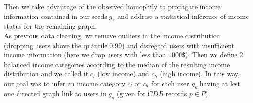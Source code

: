 
Then we take advantage of the observed homophily to propagate income information contained in our seeds $g_s$ and address a statistical inference of income status for the remaining graph. \\

As previous data cleaning, we remove outliers in the income distribution (dropping users above the quantile 0.99) and disregard users with insufficient income information (here we drop users with less than $1000\$$). Then we define 2 balanced income categories according to the median of the resulting income distribution and we called it $c_l$ (low income) and $c_h$ (high income). In this way, our goal was to infer an income category $c_l$ or $c_h$ for each user $g_k$ having at lest one directed graph link to users in $g_s$ (given for $CDR$ records  $p\in P$).\\



